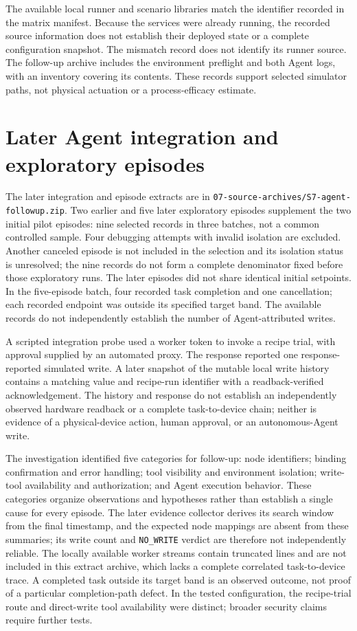\documentclass[10pt]{article}
\begin{document}
The available local runner and scenario libraries match the identifier recorded in the matrix manifest. Because the services were already running, the recorded source information does not establish their deployed state or a complete configuration snapshot. The mismatch record does not identify its runner source. The follow-up archive includes the environment preflight and both Agent logs, with an inventory covering its contents. These records support selected simulator paths, not physical actuation or a process-efficacy estimate.

\section*{Later Agent integration and exploratory episodes}
The later integration and episode extracts are in \texttt{07-source-archives/S7-agent-followup.zip}. Two earlier and five later exploratory episodes supplement the two initial pilot episodes: nine selected records in three batches, not a common controlled sample. Four debugging attempts with invalid isolation are excluded. Another canceled episode is not included in the selection and its isolation status is unresolved; the nine records do not form a complete denominator fixed before those exploratory runs. The later episodes did not share identical initial setpoints. In the five-episode batch, four recorded task completion and one cancellation; each recorded endpoint was outside its specified target band. The available records do not independently establish the number of Agent-attributed writes.

A scripted integration probe used a worker token to invoke a recipe trial, with approval supplied by an automated proxy. The response reported one response-reported simulated write. A later snapshot of the mutable local write history contains a matching value and recipe-run identifier with a readback-verified acknowledgement. The history and response do not establish an independently observed hardware readback or a complete task-to-device chain; neither is evidence of a physical-device action, human approval, or an autonomous-Agent write.

The investigation identified five categories for follow-up: node identifiers; binding confirmation and error handling; tool visibility and environment isolation; write-tool availability and authorization; and Agent execution behavior. These categories organize observations and hypotheses rather than establish a single cause for every episode. The later evidence collector derives its search window from the final timestamp, and the expected node mappings are absent from these summaries; its write count and \texttt{NO\_WRITE} verdict are therefore not independently reliable. The locally available worker streams contain truncated lines and are not included in this extract archive, which lacks a complete correlated task-to-device trace. A completed task outside its target band is an observed outcome, not proof of a particular completion-path defect. In the tested configuration, the recipe-trial route and direct-write tool availability were distinct; broader security claims require further tests.
\end{document}
